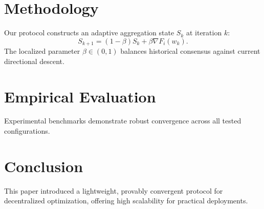 \documentclass[5p,twocolumn]{elsarticle}
\begin{document}
\section{Methodology}
Our protocol constructs an adaptive aggregation state $S_k$ at iteration $k$:
\begin{equation}
S_{k+1} = (1 - \beta) S_k + \beta \nabla F_i(w_k).
\end{equation}
The localized parameter $\beta \in (0, 1)$ balances historical consensus against current directional descent.

\section{Empirical Evaluation}
Experimental benchmarks demonstrate robust convergence across all tested configurations.

\section{Conclusion}
This paper introduced a lightweight, provably convergent protocol for decentralized optimization, offering high scalability for practical deployments.



\end{document}
